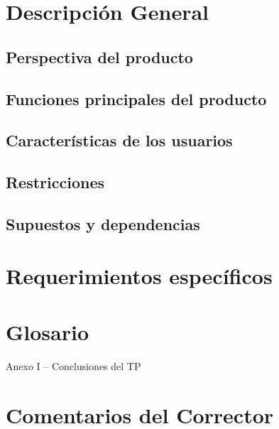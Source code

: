 \documentclass[a4paper, 10pt,titlepage]{article}
\begin{document}
\section{Descripción General	}
    \subsection{ Perspectiva del producto	}
    \subsection{ Funciones principales del producto 	}
    \subsection{ Características de los usuarios	}
    \subsection{ Restricciones	}
    \subsection{ Supuestos y dependencias	}

\section{ Requerimientos específicos	}
\section{Glosario}

\appendix 
Anexo I – Conclusiones del TP 
\section{  Comentarios del Corrector}
  \newpage




\listoffigures
\end{document}
